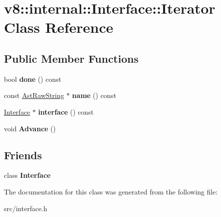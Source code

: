\hypertarget{classv8_1_1internal_1_1_interface_1_1_iterator}{}\section{v8\+:\+:internal\+:\+:Interface\+:\+:Iterator Class Reference}
\label{classv8_1_1internal_1_1_interface_1_1_iterator}
\subsection*{Public Member Functions}
\begin{DoxyCompactItemize}
\item 
\hypertarget{classv8_1_1internal_1_1_interface_1_1_iterator_a10a6fbb00d679b62a82362949716b621}{}bool {\bfseries done} () const \label{classv8_1_1internal_1_1_interface_1_1_iterator_a10a6fbb00d679b62a82362949716b621}

\item 
\hypertarget{classv8_1_1internal_1_1_interface_1_1_iterator_ac7dccef36cb9d1d6500fc6196f5798f8}{}const \hyperlink{classv8_1_1internal_1_1_ast_raw_string}{Ast\+Raw\+String} $\ast$ {\bfseries name} () const \label{classv8_1_1internal_1_1_interface_1_1_iterator_ac7dccef36cb9d1d6500fc6196f5798f8}

\item 
\hypertarget{classv8_1_1internal_1_1_interface_1_1_iterator_adeffccad6e637bf4b21b7d09059b1fd6}{}\hyperlink{classv8_1_1internal_1_1_interface}{Interface} $\ast$ {\bfseries interface} () const \label{classv8_1_1internal_1_1_interface_1_1_iterator_adeffccad6e637bf4b21b7d09059b1fd6}

\item 
\hypertarget{classv8_1_1internal_1_1_interface_1_1_iterator_adde8076f6a76d7997b0d491f106a6cba}{}void {\bfseries Advance} ()\label{classv8_1_1internal_1_1_interface_1_1_iterator_adde8076f6a76d7997b0d491f106a6cba}

\end{DoxyCompactItemize}
\subsection*{Friends}
\begin{DoxyCompactItemize}
\item 
\hypertarget{classv8_1_1internal_1_1_interface_1_1_iterator_ab2d499aedae98d5bb86006432c06888f}{}class {\bfseries Interface}\label{classv8_1_1internal_1_1_interface_1_1_iterator_ab2d499aedae98d5bb86006432c06888f}

\end{DoxyCompactItemize}


The documentation for this class was generated from the following file\+:\begin{DoxyCompactItemize}
\item 
src/interface.\+h\end{DoxyCompactItemize}
